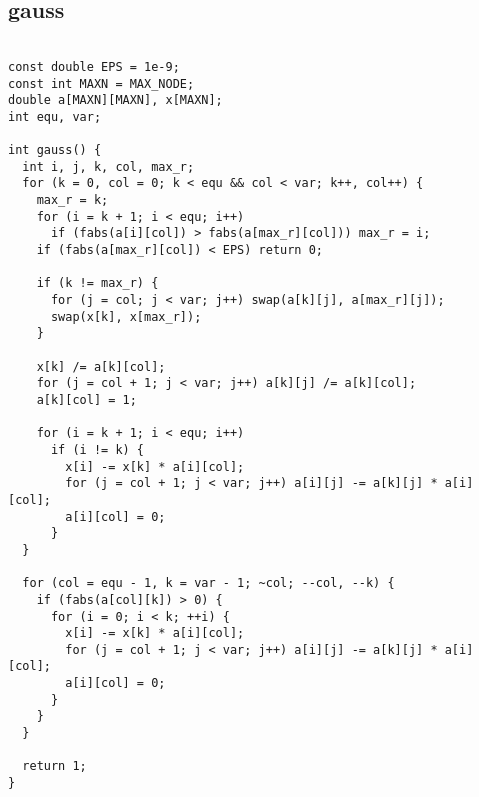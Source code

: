 \documentclass[twoside]{article}
\begin{document}
\subsection{gauss}
\begin{lstlisting}

const double EPS = 1e-9;
const int MAXN = MAX_NODE;
double a[MAXN][MAXN], x[MAXN];
int equ, var;

int gauss() {
  int i, j, k, col, max_r;
  for (k = 0, col = 0; k < equ && col < var; k++, col++) {
    max_r = k;
    for (i = k + 1; i < equ; i++)
      if (fabs(a[i][col]) > fabs(a[max_r][col])) max_r = i;
    if (fabs(a[max_r][col]) < EPS) return 0;

    if (k != max_r) {
      for (j = col; j < var; j++) swap(a[k][j], a[max_r][j]);
      swap(x[k], x[max_r]);
    }

    x[k] /= a[k][col];
    for (j = col + 1; j < var; j++) a[k][j] /= a[k][col];
    a[k][col] = 1;

    for (i = k + 1; i < equ; i++)
      if (i != k) {
        x[i] -= x[k] * a[i][col];
        for (j = col + 1; j < var; j++) a[i][j] -= a[k][j] * a[i][col];
        a[i][col] = 0;
      }
  }

  for (col = equ - 1, k = var - 1; ~col; --col, --k) {
    if (fabs(a[col][k]) > 0) {
      for (i = 0; i < k; ++i) {
        x[i] -= x[k] * a[i][col];
        for (j = col + 1; j < var; j++) a[i][j] -= a[k][j] * a[i][col];
        a[i][col] = 0;
      }
    }
  }

  return 1;
}

\end{lstlisting}
\end{document}
